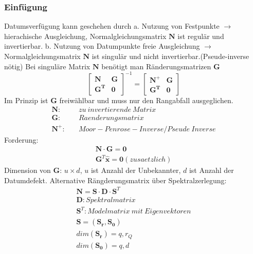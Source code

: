\documentclass[12pt]{article}
\begin{document}
\subsubsection{Einfügung}
Datumsverfügung kann geschehen durch \newline
a. Nutzung von Festpunkte \newline
$\longrightarrow$ hierachische Ausgleichung, Normalgleichungsmatrix $\bm{N}$ ist regulär und invertierbar. \newline
b. Nutzung von Datumpunkte \newline
freie Ausgleichung \newline
$\longrightarrow$ Normalgleichungsmatrix $\bm{N}$ ist singulär und nicht invertierbar.(Pseude-inverse nötig) \newline
Bei singuläre Matrix $\bm{N}$ benötigt man Ränderungsmatrizen $\bm{G}$
\begin{equation*}
\begin{bmatrix}
\bm{N} & \bm{G} \\
\bm{G^T} & \bm{0}
\end{bmatrix}^{-1} = \begin{bmatrix}
\bm{N}^+ & \bm{G} \\
\bm{G^T} & \bm{0}
\end{bmatrix}
\end{equation*}
Im Prinzip ist $\bm{G}$ freiwählbar und muss nur den Rangabfall ausgeglichen.
\begin{align*}
\bm{N}:& \quad zu\ invertierende\ Matrix \\
\bm{G}:& \quad Raenderungsmatrix \\
\bm{N}^+ :& \quad Moor-Penrose-Inverse/Pseude\ Inverse
\end{align*}
Forderung:
\begin{gather*}
\bm{N}\cdot \bm{G} = \bm{0}\\
\bm{G}^T \bm{\hat{x}} = \bm{0}(zusaetzlich)
\end{gather*}
Dimension von $\bm{G}$: $u \times d$, $u$ ist Anzahl der Unbekannter, $d$ ist Anzahl der Datumdefekt.\newline
Alternative Rängderungsmatrix über Spektralzerlegung:
\begin{gather*}
\bm{N} = \bm{S} \cdot \bm{D} \cdot \bm{S}^T\\
\bm{D}: Spektralmatrix \\
\bm{S}^T: Modelmatrix\ mit\ Eigenvektoren\\
\bm{S} = (\bm{S_r},\bm{S_0})\\
dim(\bm{S_r}) = q,r_Q\\
dim(\bm{S_0}) = q,d
\end{gather*}
\end{document}
